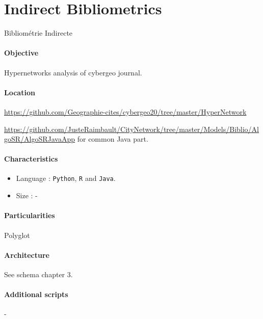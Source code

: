 \section{Indirect Bibliometrics}{Bibliométrie Indirecte}

\paragraph{Objective}

Hypernetworks analysis of cybergeo journal.

\paragraph{Location}

\url{https://github.com/Geographie-cites/cybergeo20/tree/master/HyperNetwork}

\url{https://github.com/JusteRaimbault/CityNetwork/tree/master/Models/Biblio/AlgoSR/AlgoSRJavaApp} for common Java part.

\paragraph{Characteristics}

\begin{itemize}
\item Language : \texttt{Python}, \texttt{R} and \texttt{Java}.
\item Size : -
\end{itemize}


\paragraph{Particularities}

Polyglot 

\paragraph{Architecture}

See schema chapter 3.

\paragraph{Additional scripts}

-





